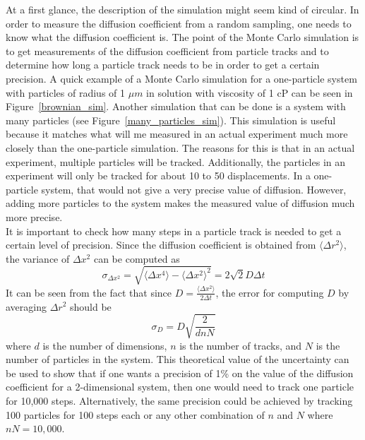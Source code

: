 \documentclass[11pt,letterpaper]{article}
\begin{document}
At a first glance, the description of the simulation might seem kind of
circular. In order to measure the diffusion coefficient from a random sampling,
one needs to know what the diffusion coefficient is. The point of the Monte
Carlo simulation is to get measurements of the diffusion coefficient from
particle tracks and to determine how long a particle track needs to be in order
to get a certain precision. A quick example of a Monte Carlo simulation for a
one-particle system with particles of radius of 1 $\mu m$ in solution with
viscosity of 1 cP can be seen in Figure~\ref{brownian_sim}. Another simulation
that can be done is a system with many particles (see
Figure~\ref{many_particles_sim}). This simulation is useful because it matches
what will me measured in an actual experiment much more closely than the
one-particle simulation. The reasons for this is that in an actual experiment,
multiple particles will be tracked. Additionally, the particles in an experiment
will only be tracked for about 10 to 50 displacements. In a one-particle system,
that would not give a very precise value of diffusion. However, adding more
particles to the system makes the measured value of diffusion much more
precise.\\

It is important to check how many steps in a particle track is needed to get a
certain level of precision. Since the diffusion coefficient is obtained from
$\langle \Delta r^2 \rangle$, the variance of $\Delta x^2$ can be computed as
\begin{equation}
    \sigma_{\Delta x^2} = \sqrt{
    \langle \Delta x^4 \rangle -
    \langle \Delta x^2 \rangle^2 }
    = 2 \sqrt{2} D \Delta t
\end{equation}
It can be seen from the fact that since
$\displaystyle D = \frac{\langle \Delta x^2 \rangle}{2 \Delta t}$, the error for
computing $D$ by averaging $\Delta r^2$ should be
\begin{equation}
    \sigma_D = D \sqrt{\frac{2}{dnN}}
\end{equation}
where $d$ is the number of dimensions, $n$ is the number of tracks, and $N$ is
the number of particles in the system. This theoretical value of the uncertainty
can be used to show that if one wants a precision of 1\% on the value of the
diffusion coefficient for a 2-dimensional system, then one would need to track
one particle for 10,000 steps. Alternatively, the same precision could be
achieved by tracking 100 particles for 100 steps each or any other combination
of $n$ and $N$ where $nN = 10,000$.
\end{document}
